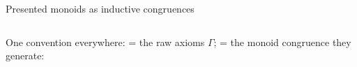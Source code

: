 \begin{frame}{Presented monoids as inductive congruences \InPaper}
\begin{columns}[c]
\begin{column}{0.52\textwidth}
One convention everywhere: \aid{\_===\_} = the raw axioms $\Gamma$;
 = the monoid congruence they generate:
\begin{code}%
\>[0]\AgdaSpace{}%
\AgdaSpace{}%
\AgdaSymbol{:}\AgdaSpace{}%
\AgdaSpace{}%
\AgdaSpace{}%
\<%
\\
\>[0][@{}l@{\AgdaIndent{0}}]%
\>[2]%
\>[8]\AgdaSymbol{:}\AgdaSpace{}%
\AgdaSpace{}%
\AgdaSpace{}%
\<%
\\
%
\>[2]%
\>[8]\AgdaSymbol{:}\AgdaSpace{}%
\AgdaSpace{}%
\AgdaSpace{}%
\AgdaSpace{}%
\AgdaSpace{}%
\AgdaSpace{}%
\AgdaSpace{}%
\<%
\\
%
\>[2]\AgdaSpace{}%
\AgdaSymbol{:}\AgdaSpace{}%
\AgdaSpace{}%
\AgdaSpace{}%
\AgdaSpace{}%
\AgdaSpace{}%
\AgdaSpace{}%
\AgdaSpace{}%
\AgdaSpace{}%
\AgdaSpace{}%
\AgdaSpace{}%
\AgdaSpace{}%
\<%
\\
%
\>[2]%
\>[8]\AgdaSymbol{:}\AgdaSpace{}%
\AgdaSpace{}%
\AgdaSpace{}%
\AgdaSpace{}%
\AgdaSpace{}%
\AgdaSpace{}%
\AgdaSpace{}%
\AgdaSpace{}%
\AgdaSpace{}%
\AgdaSpace{}%
\AgdaSpace{}%
\AgdaSpace{}%
\AgdaSpace{}%
\AgdaSpace{}%
\AgdaSpace{}%
\<%
\\
%
\>[2]%
\>[13]\AgdaSymbol{:}\AgdaSpace{}%
\AgdaSymbol{(}\AgdaSpace{}%
\AgdaSpace{}%

\end{code}
\end{column}
\end{columns}
\end{frame}
